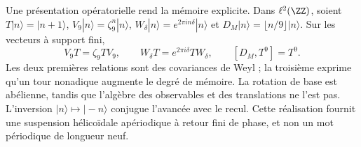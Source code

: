 Une présentation opératorielle rend la mémoire explicite. Dans \(\ell^2(\ZZ)\), soient \(T|n\rangle=|n+1\rangle\), \(V_9|n\rangle=\zeta_9^n|n\rangle\), \(W_\delta|n\rangle=e^{2\pi i n\delta}|n\rangle\) et \(D_M|n\rangle=\lfloor n/9\rfloor|n\rangle\). Sur les vecteurs à support fini,
\begin{equation}
 V_9T=\zeta_9TV_9,\qquad
 W_\delta T=e^{2\pi i\delta}TW_\delta,\qquad
 [D_M,T^9]=T^9.
 \label{x_reciprocidad:eq:weyl-relojes}
\end{equation}
Les deux premières relations sont des covariances de Weyl ; la troisième exprime qu'un tour nonadique augmente le degré de mémoire. La rotation de base est abélienne, tandis que l'algèbre des observables et des translations ne l'est pas. L'inversion \(|n\rangle\mapsto|-n\rangle\) conjugue l'avancée avec le recul. Cette réalisation fournit une suspension hélicoïdale apériodique à retour fini de phase, et non un mot périodique de longueur neuf.


